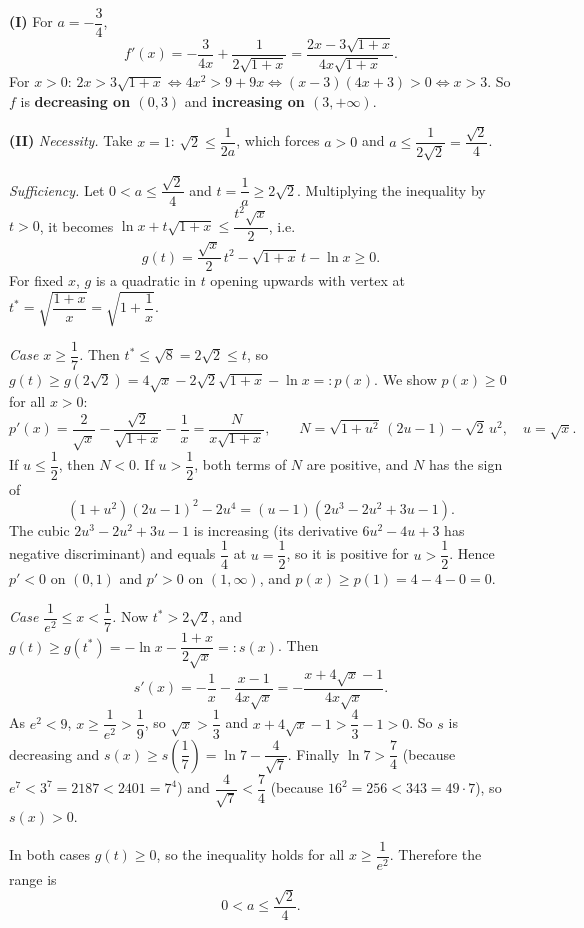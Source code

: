 \textbf{(I)} For $a=-\dfrac34$,
\[f'(x)=-\dfrac{3}{4x}+\dfrac{1}{2\sqrt{1+x}}=\dfrac{2x-3\sqrt{1+x}}{4x\sqrt{1+x}}.\]
For $x>0$: $2x>3\sqrt{1+x}\iff4x^2>9+9x\iff(x-3)(4x+3)>0\iff x>3$. So $f$ is \textbf{decreasing on $(0,3)$} and \textbf{increasing on $(3,+\infty)$}.

\textbf{(II)} \emph{Necessity.} Take $x=1$: $\sqrt2\le\dfrac{1}{2a}$, which forces $a>0$ and $a\le\dfrac{1}{2\sqrt2}=\dfrac{\sqrt2}{4}$.

\emph{Sufficiency.} Let $0<a\le\dfrac{\sqrt2}{4}$ and $t=\dfrac1a\ge2\sqrt2$. Multiplying the inequality by $t>0$, it becomes $\ln x+t\sqrt{1+x}\le\dfrac{t^2\sqrt x}{2}$, i.e.
\[g(t)=\dfrac{\sqrt x}{2}\,t^2-\sqrt{1+x}\,t-\ln x\ge0.\]
For fixed $x$, $g$ is a quadratic in $t$ opening upwards with vertex at $t^*=\sqrt{\dfrac{1+x}{x}}=\sqrt{1+\dfrac1x}$.

\emph{Case $x\ge\dfrac17$.} Then $t^*\le\sqrt8=2\sqrt2\le t$, so $g(t)\ge g\left(2\sqrt2\right)=4\sqrt x-2\sqrt2\sqrt{1+x}-\ln x=:p(x)$. We show $p(x)\ge0$ for all $x>0$:
\[p'(x)=\dfrac{2}{\sqrt x}-\dfrac{\sqrt2}{\sqrt{1+x}}-\dfrac1x=\dfrac{N}{x\sqrt{1+x}},\qquad N=\sqrt{1+u^2}\,(2u-1)-\sqrt2\,u^2,\quad u=\sqrt x.\]
If $u\le\dfrac12$, then $N<0$. If $u>\dfrac12$, both terms of $N$ are positive, and $N$ has the sign of
\[\left(1+u^2\right)(2u-1)^2-2u^4=(u-1)\left(2u^3-2u^2+3u-1\right).\]
The cubic $2u^3-2u^2+3u-1$ is increasing (its derivative $6u^2-4u+3$ has negative discriminant) and equals $\dfrac14$ at $u=\dfrac12$, so it is positive for $u>\dfrac12$. Hence $p'<0$ on $(0,1)$ and $p'>0$ on $(1,\infty)$, and $p(x)\ge p(1)=4-4-0=0$.

\emph{Case $\dfrac{1}{e^2}\le x<\dfrac17$.} Now $t^*>2\sqrt2$, and $g(t)\ge g(t^*)=-\ln x-\dfrac{1+x}{2\sqrt x}=:s(x)$. Then
\[s'(x)=-\dfrac1x-\dfrac{x-1}{4x\sqrt x}=-\dfrac{x+4\sqrt x-1}{4x\sqrt x}.\]
As $e^2<9$, $x\ge\dfrac1{e^2}>\dfrac19$, so $\sqrt x>\dfrac13$ and $x+4\sqrt x-1>\dfrac43-1>0$. So $s$ is decreasing and $s(x)\ge s\left(\dfrac17\right)=\ln7-\dfrac{4}{\sqrt7}$. Finally $\ln7>\dfrac74$ (because $e^7<3^7=2187<2401=7^4$) and $\dfrac{4}{\sqrt7}<\dfrac74$ (because $16^2=256<343=49\cdot7$), so $s(x)>0$.

In both cases $g(t)\ge0$, so the inequality holds for all $x\ge\dfrac{1}{e^2}$. Therefore the range is
\[\boxed{0<a\le\dfrac{\sqrt2}{4}}.\]
